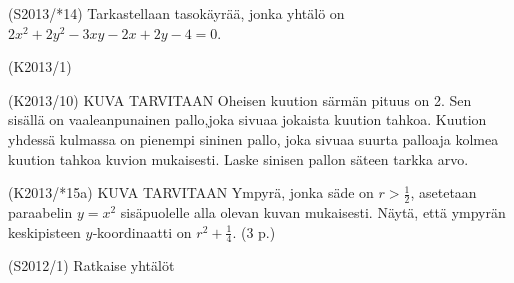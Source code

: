 \begin{tehtava} (S2013/*14)
Tarkastellaan tasokäyrää, jonka yhtälö on $2x^2+2y^2-3xy-2x+2y-4=0$.
\begin{alakohdat}
	\end{alakohdat}
\end{tehtava}

\begin{tehtava} (K2013/1)
\begin{alakohdat}
	\end{alakohdat}
\end{tehtava}


\begin{tehtava}(K2013/10) KUVA TARVITAAN
Oheisen kuution särmän pituus on 2. Sen sisällä on vaaleanpunainen pallo,joka sivuaa jokaista kuution tahkoa. Kuution yhdessä kulmassa on pienempi sininen pallo, joka sivuaa suurta palloaja kolmea kuution tahkoa kuvion mukaisesti. Laske sinisen pallon säteen tarkka arvo. 
\end{tehtava}


\begin{tehtava}(K2013/*15a) KUVA TARVITAAN
Ympyrä, jonka säde on $r>\frac{1}{2}$, asetetaan paraabelin $y=x^2$ sisäpuolelle alla olevan kuvan mukaisesti. Näytä, että ympyrän keskipisteen $y$‐koordinaatti on $r^2+\frac{1}{4}. $ (3
p.)
\end{tehtava}

\begin{tehtava} (S2012/1) Ratkaise yhtälöt
  \begin{alakohdat}
  \end{alakohdat}
\end{tehtava}

